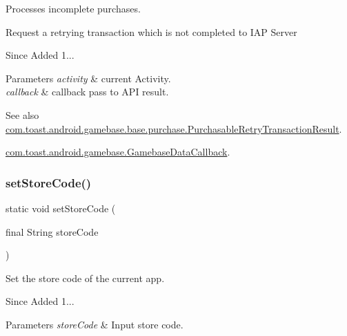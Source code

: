 Processes incomplete purchases. 

Request a retrying transaction which is not completed to I\+AP Server

\begin{DoxySince}{Since}
Added 1... 
\end{DoxySince}

\begin{DoxyParams}{Parameters}
{\em activity} & current Activity. \\
\hline
{\em callback} & callback pass to A\+PI result. \\
\hline
\end{DoxyParams}
\begin{DoxySeeAlso}{See also}
\hyperlink{classcom_1_1toast_1_1android_1_1gamebase_1_1base_1_1purchase_1_1_purchasable_retry_transaction_result}{com.\+toast.\+android.\+gamebase.\+base.\+purchase.\+Purchasable\+Retry\+Transaction\+Result}. 

\hyperlink{interfacecom_1_1toast_1_1android_1_1gamebase_1_1_gamebase_data_callback}{com.\+toast.\+android.\+gamebase.\+Gamebase\+Data\+Callback}. 
\end{DoxySeeAlso}
\mbox{\label{classcom_1_1toast_1_1android_1_1gamebase_1_1_gamebase_1_1_purchase_a8933fcc2fc156c87feee53efadfa4bb0}} 
\subsubsection{\texorpdfstring{set\+Store\+Code()}{setStoreCode()}}
{\footnotesize\ttfamily static void set\+Store\+Code (\begin{DoxyParamCaption}\item[{final String}]{store\+Code }\end{DoxyParamCaption})\hspace{0.3cm}{\ttfamily [static]}}



Set the store code of the current app. 

\begin{DoxySince}{Since}
Added 1... 
\end{DoxySince}

\begin{DoxyParams}{Parameters}
{\em store\+Code} & Input store code. \\
\hline
\end{DoxyParams}
